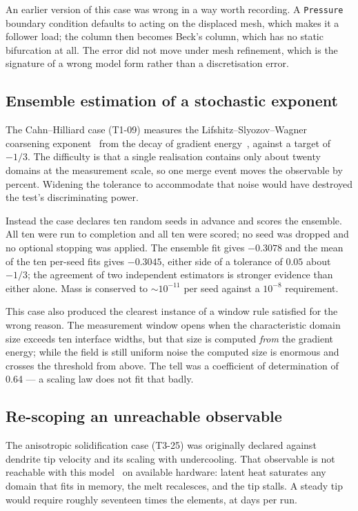 \documentclass[11pt,a4paper]{article}
\begin{document}
An earlier version of this case was wrong in a way worth recording. A
\texttt{Pressure} boundary condition defaults to acting on the displaced mesh,
which makes it a follower load; the column then becomes Beck's column, which has
no static bifurcation at all. The error did not move under mesh refinement, which
is the signature of a wrong model form rather than a discretisation error.

\subsection{Ensemble estimation of a stochastic exponent}
The Cahn--Hilliard case (T1-09) measures the Lifshitz--Slyozov--Wagner coarsening
exponent~\cite{lifshitz1961} from the decay of gradient
energy~\cite{cahn1958}, against a target of $-1/3$. The difficulty is
that a single realisation contains only about twenty domains at the measurement
scale, so one merge event moves the observable by percent. Widening the tolerance
to accommodate that noise would have destroyed the test's discriminating power.

Instead the case declares ten random seeds in advance and scores the ensemble.
All ten were run to completion and all ten were scored; no seed was dropped and
no optional stopping was applied. The ensemble fit gives $-0.3078$ and the mean
of the ten per-seed fits gives $-0.3045$, either side of a tolerance of $0.05$
about $-1/3$; the agreement of two independent estimators is stronger evidence
than either alone. Mass is conserved to $\sim10^{-11}$ per seed against a
$10^{-8}$ requirement.

This case also produced the clearest instance of a window rule satisfied for the
wrong reason. The measurement window opens when the characteristic domain size
exceeds ten interface widths, but that size is computed \emph{from} the gradient
energy; while the field is still uniform noise the computed size is enormous and
crosses the threshold from above. The tell was a coefficient of determination of
0.64 --- a scaling law does not fit that badly.

\subsection{Re-scoping an unreachable observable}
The anisotropic solidification case (T3-25) was originally declared against
dendrite tip velocity and its scaling with undercooling. That observable is not
reachable with this model~\cite{kobayashi1993} on available hardware: latent heat
saturates any domain that fits in memory, the melt recalesces, and the tip
stalls. A steady tip would require roughly seventeen times the elements, at days
per run.
\end{document}
